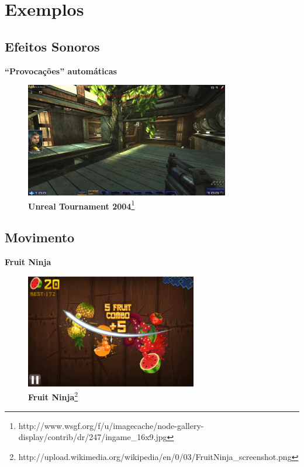 \expandafter\documentclass\expandafter[table, usenames, svgnames, dvipsnames, \classopts]{beamer}
\begin{document}
\section{Exemplos}

\subsection{Efeitos Sonoros}
\begin{frame}{\textbf{``Provocações'' automáticas}}
	\centering
	\begin{figure}
        \includegraphics[height=5cm]{taunt}
        \caption{\scriptsize\textbf{Unreal Tournament 2004}\footnote{http://www.wsgf.org/f/u/imagecache/node-gallery-display/contrib/dr/247/ingame\_16x9.jpg}}
	\end{figure}
\end{frame}

\subsection{Movimento}
\begin{frame}{\textbf{Fruit Ninja}}
	\centering
	\begin{figure}
        \includegraphics[height=5cm]{fruit_ninja}
        \caption{\scriptsize\textbf{Fruit Ninja}\footnote{http://upload.wikimedia.org/wikipedia/en/0/03/FruitNinja\_screenshot.png}}
	\end{figure}
\end{frame}
\end{document}
